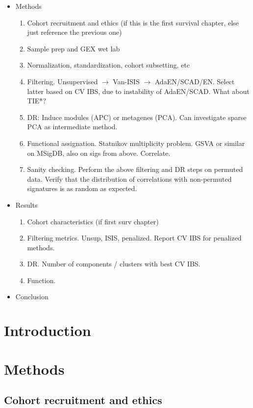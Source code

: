 \documentclass[thesis.tex]{subfiles}
\begin{document}
\begin{itemize}
  \item Methods
  \begin{enumerate}
    \item Cohort recruitment and ethics (if this is the first survival chapter, else just reference the previous one)
    \item Sample prep and GEX wet lab
    \item Normalization, standardization, cohort subsetting, etc
    \item Filtering.  Unsupervised $\rightarrow$ Van-ISIS $\rightarrow$ AdaEN/SCAD/EN.  Select latter based on CV IBS, due to instability of AdaEN/SCAD.  What about TIE*?
    \item DR: Induce modules (APC) or metagenes (PCA).  Can investigate sparse PCA as intermediate method.
    \item Functional assignation.  Statnikov multiplicity problem.  GSVA or similar on MSigDB, also on sigs from above.  Correlate.
    \item Sanity checking.  Perform the above filtering and DR steps on permuted data.  Verify that the distribution of correlations with non-permuted signatures is as random as expected.
  \end{enumerate}
  
  \item Results
  \begin{enumerate}
    \item Cohort characteristics (if first surv chapter)
    \item Filtering metrics.  Unsup, ISIS, penalized.  Report CV IBS for penalized methods.
    \item DR.  Number of components / clusters with best CV IBS.
    \item Function.
  \end{enumerate}

  \item Conclusion
\end{itemize}

\section{Introduction}

\section{Methods}
\subsection{Cohort recruitment and ethics}
\end{document}
